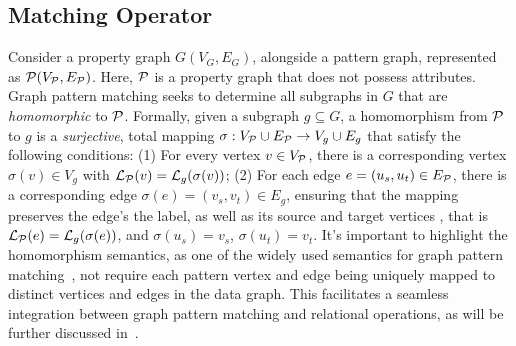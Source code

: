 
\subsection{Matching Operator}
\label{sec:graph-relational-algebra}


Consider a property graph \(G(V_G, E_G)\), alongside a pattern graph, represented as \(\mathcal{P}(V_{\mathcal{P}}, E_{\mathcal{P}})\). Here, \(\mathcal{P}\) is a property graph that does not possess attributes. %
Graph pattern matching seeks to determine all subgraphs in \(G\) that are \emph{homomorphic} to \(\mathcal{P}\).
Formally, given a subgraph $g \subseteq G$, a homomorphism from \(\mathcal{P}\) to \(g\) is a \emph{surjective}, total mapping \(\sigma: V_{\mathcal{P}} \cup E_{\mathcal{P}} \to V_{g} \cup E_{g}\) that satisfy the following conditions: (1) For every vertex \(v \in V_{\mathcal{P}}\), there is a corresponding vertex \(\sigma(v) \in V_{g}\) with \(\mathcal{L}_{\mathcal{P}}(v) = \mathcal{L}_{g}(\sigma(v))\); (2) For each edge \(e = (u_s, u_t) \in E_{\mathcal{P}}\), there is a corresponding edge \(\sigma(e) = (v_s, v_t) \in E_{g}\), ensuring that the mapping preserves the edge's the label, as well as its source and target vertices , that is \(\mathcal{L}_{\mathcal{P}}(e) = \mathcal{L}_g(\sigma(e))\), and \(\sigma(u_s) = v_s\), \(\sigma(u_t) = v_t\). It's important to highlight the homomorphism semantics, as one of the widely used semantics for graph pattern matching~\cite{angles2017foundations},  not require each pattern vertex and edge being uniquely mapped to distinct vertices and edges in the data graph. This facilitates a seamless integration between graph pattern matching and relational operations, as will be further discussed in~.

